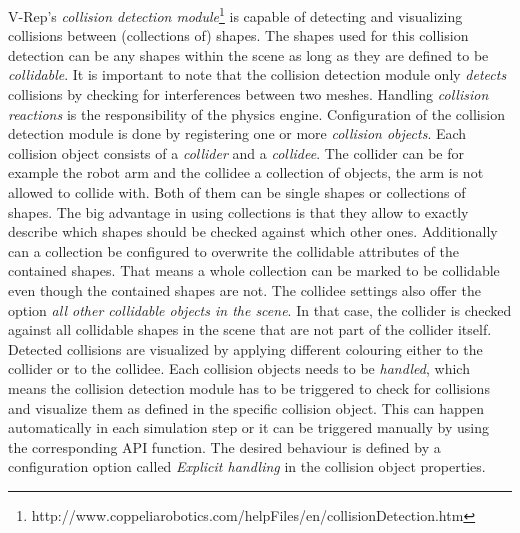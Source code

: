 V-Rep's \emph{collision detection module}\footnote{http://www.coppeliarobotics.com/helpFiles/en/collisionDetection.htm} is capable of detecting and visualizing collisions between (collections of) shapes. The shapes used for this collision detection can be any shapes within the scene as long as they are defined to be \emph{collidable}. It is important to note that the collision detection module only \textit{detects} collisions by checking for interferences between two meshes. Handling \emph{collision reactions} is the responsibility of the  physics engine. Configuration of the collision detection module is done by registering one or more \emph{collision objects}. Each collision object consists of a \emph{collider} and a \emph{collidee}. The collider can be for example the robot arm and the collidee a collection of objects, the arm is not allowed to collide with. Both of them can be single shapes or collections of shapes. The big advantage in using collections is that they allow to exactly describe which shapes should be checked against which other ones. Additionally can a collection be configured to overwrite the collidable attributes of the contained shapes. That means a whole collection can be marked to be collidable even though the contained shapes are not. The collidee settings also offer the option \emph{all other collidable objects in the scene}. In that case, the collider is checked against all collidable shapes in the scene that are not part of the collider itself. Detected collisions are visualized by applying different colouring either to the collider or to the collidee. Each collision objects needs to be \emph{handled}, which means the collision detection module has to be triggered to check for collisions and visualize them as defined in the specific collision object. This can happen automatically in each simulation step or it can be triggered manually by using the corresponding API function. The desired behaviour is defined by a configuration option called \emph{Explicit handling} in the collision object properties. \\

